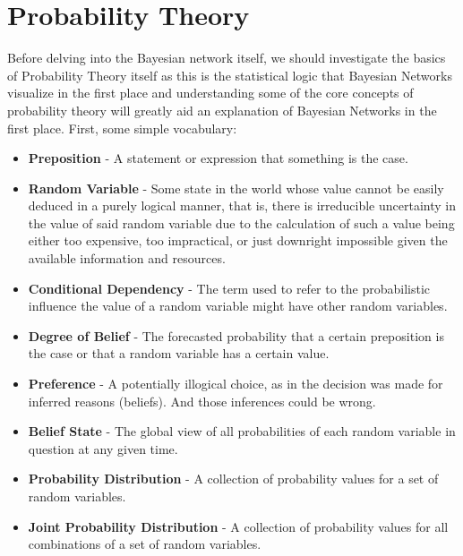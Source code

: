 \documentclass[a4paper,12pt]{article}
\begin{document}
\section{Probability Theory}

Before delving into the Bayesian network itself, we should investigate the basics of Probability Theory itself as this is the statistical logic that Bayesian Networks visualize in the first place and understanding some of the core concepts of probability theory will greatly aid an explanation of Bayesian Networks in the first place. First, some simple vocabulary\cite{Russell2003}:

\begin{itemize}
  \item \textbf{Preposition} - A statement or expression that something is the case.
  \item \textbf{Random Variable} - Some state in the world whose value cannot be easily deduced in a purely logical manner, that is, there is irreducible uncertainty in the value of said random variable due to the calculation of such a value being either too expensive, too impractical, or just downright impossible given the available information and resources.
  \item \textbf{Conditional Dependency} - The term used to refer to the probabilistic influence the value of a random variable might have other random variables.
  \item \textbf{Degree of Belief} - The forecasted probability that a certain preposition is the case or that a random variable has a certain value.
  \item \textbf{Preference} - A potentially illogical choice, as in the decision was made for inferred reasons (beliefs). And those inferences could be wrong.
  \item \textbf{Belief State} - The global view of all probabilities of each random variable in question at any given time.
  \item \textbf{Probability Distribution} - A collection of probability values for a set of random variables.
  \item \textbf{Joint Probability Distribution} - A collection of probability values for all combinations of a set of random variables.
\end{itemize}
\end{document}
